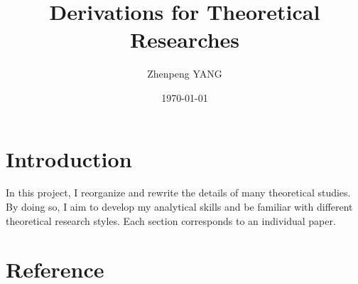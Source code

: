 \documentclass{article}
\title{Derivations for Theoretical Researches}
\author{Zhenpeng YANG}
\date{\today}
\begin{document}
\maketitle
\section{Introduction}
In this project, I reorganize and rewrite the details of many theoretical studies. By doing so, I aim to develop my analytical skills and be familiar with different theoretical research styles. Each section corresponds to an individual paper.\par

\section*{Reference}

\end{document}
